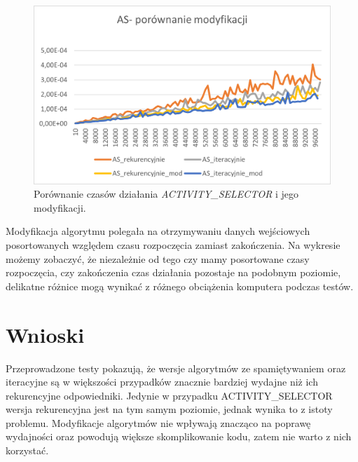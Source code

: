 \documentclass{article}
\begin{document}
	\begin{figure}[H]
		\centering
		\includegraphics[width=\textwidth]{as_mod.png}
		\caption{Porównanie czasów działania \textit{ACTIVITY\_SELECTOR} i jego modyfikacji.}
	\end{figure}
	Modyfikacja algorytmu polegała na otrzymywaniu danych wejściowych posortowanych względem czasu rozpoczęcia zamiast zakończenia. Na wykresie możemy zobaczyć, że niezależnie od tego czy mamy posortowane czasy rozpoczęcia, czy zakończenia czas działania pozostaje na podobnym poziomie, delikatne różnice mogą wynikać z różnego obciążenia komputera podczas testów. 
	\newpage
	\section{Wnioski}
	Przeprowadzone testy pokazują, że wersje algorytmów ze spamiętywaniem oraz iteracyjne są w większości przypadków znacznie bardziej wydajne niż ich rekurencyjne odpowiedniki. Jedynie w przypadku ACTIVITY\_SELECTOR wersja rekurencyjna jest na tym samym poziomie, jednak wynika to z istoty problemu. Modyfikacje algorytmów nie wpływają znacząco na poprawę wydajności oraz powodują większe skomplikowanie kodu, zatem nie warto z nich korzystać.
	
\end{document}

